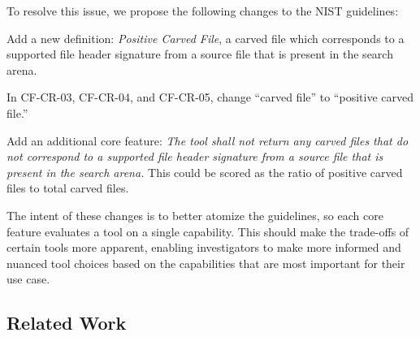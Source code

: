 To resolve this issue, we propose the following changes to the NIST guidelines:
\begin{arabiclist}
 \item Add a new definition: \emph{Positive Carved File}, a carved file which corresponds to a supported file header signature from a source file that is present in the search arena. 
 \item In CF-CR-03, CF-CR-04, and CF-CR-05, change ``carved file'' to ``positive carved file.''
 \item Add an additional core feature: \emph{The tool shall not return any carved files that do not correspond to a supported file header signature from a source file that is present in the search arena.} This could be scored as the ratio of positive carved files to total carved files.
\end{arabiclist}

The intent of these changes is to better atomize the guidelines, so each core feature evaluates a tool on a single capability.
This should make the trade-offs of certain tools more apparent, enabling investigators to make more informed and nuanced tool choices based on the capabilities that are most important for their use case.

\subsection{Related Work}

